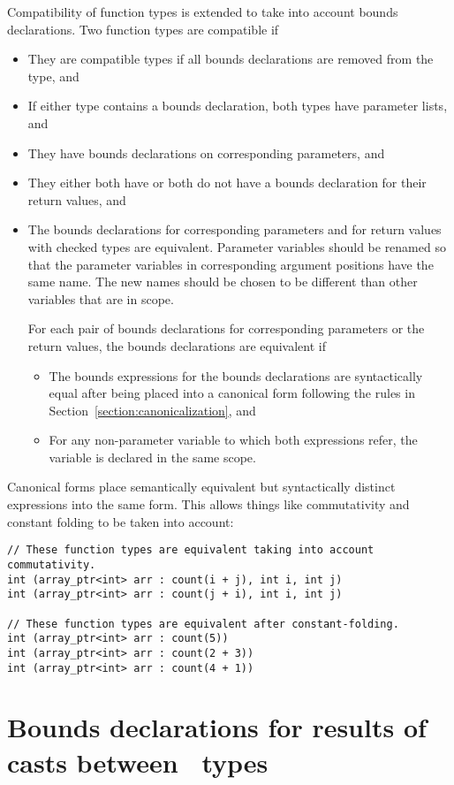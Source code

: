 Compatibility of function types is extended to take into account
bounds declarations.  Two function types are compatible if
\begin{itemize}
\item They are compatible types if all bounds declarations are removed from the type, and
\item If either type contains a bounds declaration, both types have parameter lists, and
\item They have bounds declarations on corresponding parameters, and
\item They either both have or both do not have a bounds declaration for their return values, and
\item The bounds declarations for corresponding parameters and for return values with
checked types are equivalent.
Parameter variables should be renamed so that the parameter variables
in corresponding argument positions have the same name.  The new names should be chosen
to be different than other variables that are in scope.

For each pair of bounds declarations for corresponding
parameters or the return values, the bounds declarations are equivalent if
\begin{itemize}
\item The bounds expressions for the bounds declarations are syntactically equal
after being placed into a canonical form following the rules in Section~\ref{section:canonicalization}, and
\item  For any non-parameter variable  to which both expressions refer, the variable is
declared in the same scope.
\end{itemize}
\end{itemize}

Canonical forms place semantically equivalent but syntactically distinct
expressions into the same form.  This allows things like commutativity and constant
folding to be taken into account:
\begin{verbatim}
// These function types are equivalent taking into account commutativity.
int (array_ptr<int> arr : count(i + j), int i, int j)
int (array_ptr<int> arr : count(j + i), int i, int j)

// These function types are equivalent after constant-folding.
int (array_ptr<int> arr : count(5))
int (array_ptr<int> arr : count(2 + 3))
int (array_ptr<int> arr : count(4 + 1))
\end{verbatim}

\section{Bounds declarations for results of casts between \arrayptr\ types}
\label{section:pointer-cast-results}

